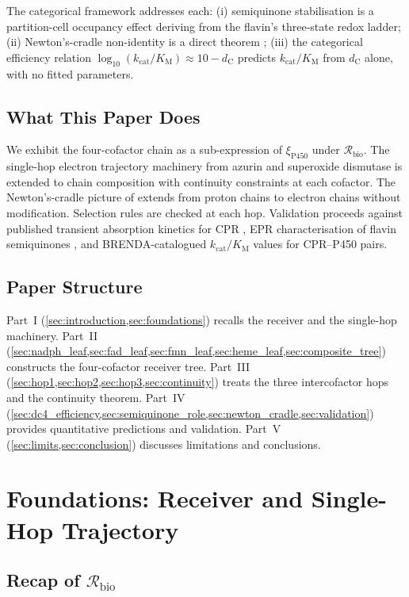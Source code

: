 \documentclass[11pt,twocolumn,a4paper]{article}
\theoremstyle{definition}
\theoremstyle{remark}
\newcommand{\Recv}{\mathcal{R}}
\newcommand{\Sexp}{\xi}
\newcommand{\dC}{d_{\mathrm{C}}}
\newcommand{\kcat}{k_{\mathrm{cat}}}
\newcommand{\KM}{K_{\mathrm{M}}}
\begin{document}
The categorical framework addresses each: (i) semiquinone stabilisation
is a partition-cell occupancy effect deriving from the flavin's three-state
redox ladder; (ii) Newton's-cradle non-identity is a direct theorem
\citep{sachikonye2025_flux, sachikonye2025_paper3}; (iii) the
categorical efficiency relation $\log_{10}(\kcat/\KM) \approx 10 - \dC$
predicts $\kcat/\KM$ from $\dC$ alone, with no fitted parameters.

\subsection{What This Paper Does}

We exhibit the four-cofactor chain as a sub-expression of $\Sexp_{\mathrm{P450}}$
under $\Recv_{\mathrm{bio}}$. The single-hop electron trajectory machinery from
azurin \citep{sachikonye2025_azurin} and superoxide dismutase
\citep{sachikonye2025_sod1} is extended to chain composition with continuity
constraints at each cofactor. The Newton's-cradle picture of
\citep{sachikonye2025_flux} extends from proton chains to electron chains
without modification. Selection rules are checked at each hop. Validation
proceeds against published transient absorption kinetics for CPR
\citep{murataliev2004}, EPR characterisation of flavin semiquinones
\citep{narayanasami1997}, and BRENDA-catalogued $\kcat/\KM$ values for
CPR--P450 pairs.

\subsection{Paper Structure}

Part~I (\cref{sec:introduction,sec:foundations}) recalls the receiver and
the single-hop machinery. Part~II (\cref{sec:nadph_leaf,sec:fad_leaf,sec:fmn_leaf,sec:heme_leaf,sec:composite_tree})
constructs the four-cofactor receiver tree. Part~III
(\cref{sec:hop1,sec:hop2,sec:hop3,sec:continuity}) treats the three
intercofactor hops and the continuity theorem. Part~IV
(\cref{sec:dc4_efficiency,sec:semiquinone_role,sec:newton_cradle,sec:validation})
provides quantitative predictions and validation. Part~V
(\cref{sec:limits,sec:conclusion}) discusses limitations and conclusions.

\section{Foundations: Receiver and Single-Hop Trajectory}
\label{sec:foundations}

\subsection{Recap of $\Recv_{\mathrm{bio}}$}
\end{document}
